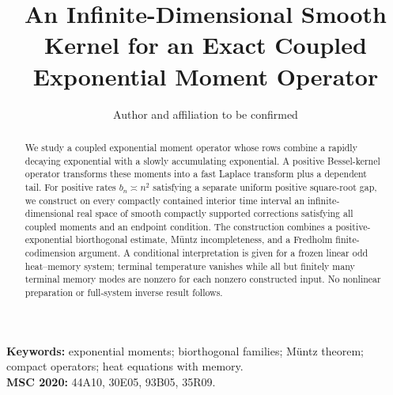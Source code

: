 \documentclass[11pt,a4paper]{article}
\title{An Infinite-Dimensional Smooth Kernel for an Exact Coupled Exponential Moment Operator}
\author{Author and affiliation to be confirmed}
\date{}
\numberwithin{equation}{section}
\theoremstyle{definition}
\begin{document}
\maketitle
\begin{abstract}
We study a coupled exponential moment operator whose rows combine a rapidly decaying exponential with a slowly accumulating exponential. A positive Bessel-kernel operator transforms these moments into a fast Laplace transform plus a dependent tail. For positive rates \(b_n\asymp n^2\) satisfying a separate uniform positive square-root gap, we construct on every compactly contained interior time interval an infinite-dimensional real space of smooth compactly supported corrections satisfying all coupled moments and an endpoint condition. The construction combines a positive-exponential biorthogonal estimate, M\"untz incompleteness, and a Fredholm finite-codimension argument. A conditional interpretation is given for a frozen linear odd heat--memory system; terminal temperature vanishes while all but finitely many terminal memory modes are nonzero for each nonzero constructed input. No nonlinear preparation or full-system inverse result follows.
\end{abstract}
\noindent\textbf{Keywords:} exponential moments; biorthogonal families; M\"untz theorem; compact operators; heat equations with memory.\\
\textbf{MSC 2020:} 44A10, 30E05, 93B05, 35R09.













\end{document}
